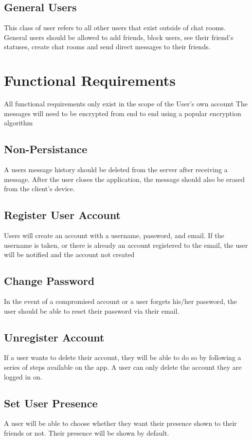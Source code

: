 \documentclass[11pt]{article}
\theoremstyle{plain}
\theoremstyle{definition}
\begin{document}
\subsection{General Users}
This class of user refers to all other users that exist outside of chat rooms. General users should be allowed to add friends, block users, see their friend's statuses, create chat rooms and send direct messages to their friends.

\section{Functional Requirements}\label{sec:funcrequirements}
All functional requirements only exist in the scope of the User's own account
The messages will need to be encrypted from end to end using a popular encryption algorithm
\subsection{Non-Persistance}
A users message history should be deleted from the server after receiving a message. After the user closes the application, the message should also be erased from the client's device.
\subsection{Register User Account}
Users will create an account with a username, password, and email. If the username is taken, or there is already an account registered to the email, the user will be notified and the account not created
\subsection{Change Password}
In the event of a compromised account or a user forgets his/her password, the user should be able to reset their password via their email.
\subsection{Unregister Account}
If a user wants to delete their account, they will be able to do so by following a series of steps available on the app. A user can only delete the account they are logged in on.
\subsection{Set User Presence}
A user will be able to choose whether they want their presence shown to their friends or not. Their presence will be shown by default.
\end{document}
